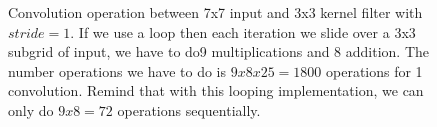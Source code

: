 \begin{figure}[H]
    \centering
    \caption{Convolution operation between 7x7 input and 3x3 kernel filter with $stride=1$. If we use a loop then each iteration we slide over a 3x3 subgrid of input, we have to do9 multiplications and 8 addition. The number operations we have to do is $9x8x25=1800$ operations for 1 convolution. Remind that with this looping implementation, we can only do $9x8=72$ operations sequentially.}
\end{figure}
